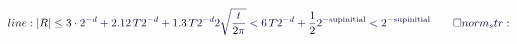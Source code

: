 \documentclass[12pt]{article}
\begin{document}
\makeatletter
\renewcommand*{\@textcolor}[3]{%
  \protect\leavevmode
  \begingroup
    \color#1{#2}#3%
  \endgroup
}
\makeatother
\begin{displaymath}
\mathcolor[RGB]{0,0,15}{line:
|R|\leq} \mathcolor[RGB]{0,0,30}{3\cdot} \mathcolor[RGB]{0,0,45}{2^{-d}+2.12\,T2^{-d}+1.3\,T2^{-d}2\sqrt{\frac{t}{2\pi}}<6\,T2^{-d}+\frac{1}{2}2^{-\text{supinitial}}<2^{-\text{supinitial}}\qedhere

norm_str:}
\end{displaymath}
\end{document}
